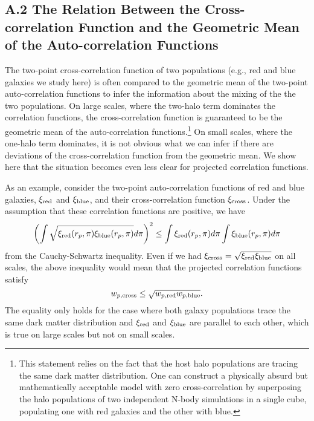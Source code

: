 \documentclass[]{emulateapj}
\begin{document}
\subsection{A.2 The Relation Between the Cross-correlation Function and the Geometric Mean of the Auto-correlation Functions}

The two-point cross-correlation function of two populations (e.g., red and 
blue galaxies we study here) is often compared to the geometric mean of 
the two-point auto-correlation functions to infer the information about the
mixing of the the two populations. On large scales, where the two-halo term
dominates the correlation functions, the cross-correlation function is
guaranteed to be the geometric mean of the auto-correlation 
functions.\footnote{This statement relies on the fact that the
host halo populations are tracing the same dark matter distribution.
One can construct a physically absurd but mathematically acceptable
model with zero cross-correlation by superposing the halo populations
of two independent N-body simulations in a single cube, populating one
with red galaxies and the other with blue.}
On small scales, where the one-halo term dominates, it is not obvious 
what we can infer if there are deviations of the cross-correlation function
from the geometric mean. We show here that the situation becomes even less
clear for projected correlation functions.

As an example, consider the two-point auto-correlation functions of red and 
blue galaxies, $\xi_{\rm red}$ and $\xi_{\rm blue}$, and their 
cross-correlation function $\xi_{\rm cross}$. Under the assumption that
these correlation functions are positive, we have
\begin{equation}
\left(\int \sqrt{\xi_{\rm red}(r_p,\pi)
                 \xi_{\rm blue}(r_p,\pi)} d\pi\right)^2
\leq \int \xi_{\rm red}(r_p,\pi) d\pi 
     \int \xi_{\rm blue}(r_p,\pi) d\pi
\end{equation}
from the Cauchy-Schwartz inequality. Even if we had 
$\xi_{\rm cross}=\sqrt{\xi_{\rm red}\xi_{\rm blue}}$ on all scales, the 
above inequality would mean that the projected correlation functions satisfy
\begin{equation}
w_{p,{\rm cross}} \leq \sqrt{ w_{p,{\rm red}} w_{p,{\rm blue}} }.
\end{equation}
The equality only holds for the case where both galaxy populations trace 
the same dark matter distribution and $\xi_{\rm red}$ and $\xi_{\rm blue}$
are parallel to each other, which is true on large scales but not on small
scales. 
\end{document}
